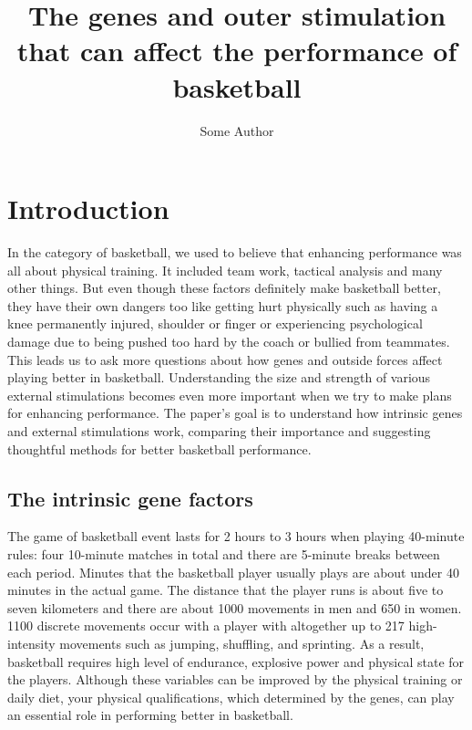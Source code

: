 \documentclass{article}
\title{The genes and outer stimulation that can affect the performance of basketball}
\author{Some Author}
\begin{document}
\maketitle
\newpage
\tableofcontents
\newpage


\section{Introduction}


In the category of basketball, we used to believe that enhancing performance was all about physical training. It included team work, tactical analysis and many other things. But even though these factors definitely make basketball better, they have their own dangers too like getting hurt physically such as having a knee permanently injured, shoulder or finger or experiencing psychological damage due to being pushed too hard by the coach or bullied from teammates. This leads us to ask more questions about how genes and outside forces affect playing better in basketball. Understanding the size and strength of various external stimulations becomes even more important when we try to make plans for enhancing performance. The paper's goal is to understand how intrinsic genes and external stimulations work, comparing their importance and suggesting thoughtful methods for better basketball performance. 


\subsection{The intrinsic gene factors}
The game of basketball event lasts for 2 hours to 3 hours when playing 40-minute rules: four 10-minute matches in total and there are 5-minute breaks between each period. Minutes that the basketball player usually plays are about under 40 minutes in the actual game. The distance that the player runs is about five to seven kilometers and there are about 1000 movements in men and 650 in women. 1100 discrete movements occur with a player with altogether up to 217 high-intensity movements such as jumping, shuffling, and sprinting.\autocite[13-14]{raduScienceBasketball2018} As a result, basketball requires high level of endurance, explosive power and physical state for the players. Although these variables can be improved by the physical training or daily diet, your physical qualifications, which determined by the genes, can play an essential role in performing better in basketball.
\end{document}
